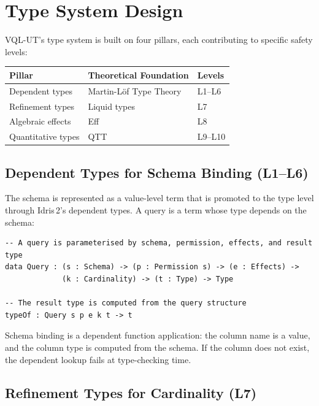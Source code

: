 \documentclass[11pt,a4paper]{article}
\newcommand{\VQL}{\textsc{VQL-UT}}
\begin{document}
\section{Type System Design}\label{sec:typesystem}

\VQL{}'s type system is built on four pillars, each contributing to
specific safety levels:

\begin{center}
\begin{tabular}{lll}
\toprule
\textbf{Pillar} & \textbf{Theoretical Foundation} & \textbf{Levels} \\
\midrule
Dependent types & Martin-L\"of Type Theory & L1--L6 \\
Refinement types & Liquid types \citep{rondon2008liquid} & L7 \\
Algebraic effects & Eff \citep{bauer2015programming} & L8 \\
Quantitative types & QTT \citep{atkey2018syntax,mcbride2016got} & L9--L10 \\
\bottomrule
\end{tabular}
\end{center}

\subsection{Dependent Types for Schema Binding (L1--L6)}

The schema is represented as a value-level term that is promoted to
the type level through Idris\,2's dependent types.  A query is a
term whose type depends on the schema:

\begin{lstlisting}[language=Idris2]
-- A query is parameterised by schema, permission, effects, and result type
data Query : (s : Schema) -> (p : Permission s) -> (e : Effects) ->
             (k : Cardinality) -> (t : Type) -> Type

-- The result type is computed from the query structure
typeOf : Query s p e k t -> t
\end{lstlisting}

Schema binding is a dependent function application: the column name
is a value, and the column type is computed from the schema.  If the
column does not exist, the dependent lookup fails at type-checking
time.

\subsection{Refinement Types for Cardinality (L7)}
\end{document}
